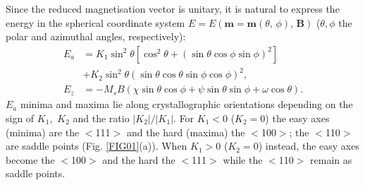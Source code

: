 Since the reduced magnetisation vector is unitary, it is natural to express the energy in the spherical coordinate system $E=E(\boldsymbol{m}=\boldsymbol{m}(\theta,\,\phi),\, \boldsymbol{B})$ ($\theta, \phi$ the polar and azimuthal angles, respectively):
\begin{align}
E_a &= K_1 \sin^2\theta\left[ \cos^2\theta + \left( \sin\theta\cos\phi\sin\phi\right)^2 \right] \nonumber \\
    &+ K_2\sin^2\theta \left( \sin\theta\cos\theta\sin\phi\cos\phi \right)^2, \label{EQ:ENERGY anis} \\
E_z &= -M_sB \left( \chi\sin\theta\cos\phi + \psi\sin\theta\sin\phi + \omega\cos\theta\right). \label{EQ:ENERGY ext}
\end{align}
$E_a$ minima and maxima lie along crystallographic orientations depending on the sign of $K_1,\,\,K_2$ and the ratio $|K_2| / |K_1|$. For $K_1<0$ ($K_2=0$) the easy axes (minima) are the $<$111$>$ and the hard (maxima) the $<$100$>$; the $<$110$>$ are saddle points (Fig. \ref{FIG01}(a)). When $K_1>0$ ($K_2=0$) instead, the easy axes become the $<$100$>$ and the hard the $<$111$>$ while the $<$110$>$ remain as saddle points.\par

